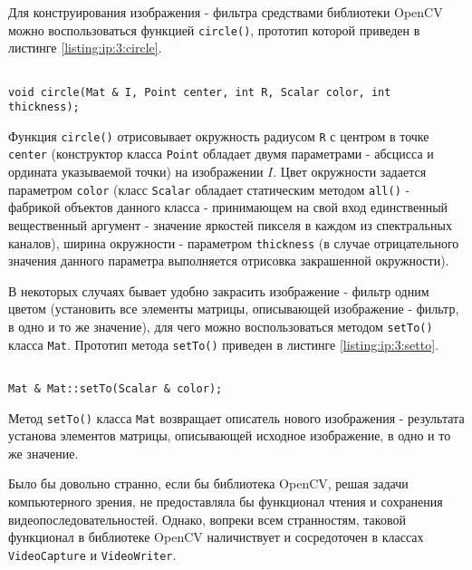 Для конструирования изображения - фильтра средствами библиотеки OpenCV можно воспользоваться функцией \verb|circle()|, прототип которой приведен в листинге \ref{listing:ip:3:circle}.

\begin{lstlisting}

void circle(Mat & I, Point center, int R, Scalar color, int thickness);

\end{lstlisting}
\mylistingend

Функция \verb|circle()| отрисовывает окружность радиусом \verb|R| с центром в точке \verb|center| (конструктор класса \verb|Point| обладает двумя параметрами - абсцисса и ордината указываемой точки) на изображении $I$. Цвет окружности задается параметром \verb|color| (класс \verb|Scalar| обладает статическим методом \verb|all()| - фабрикой объектов данного класса - принимающем на свой вход единственный вещественный аргумент - значение яркостей пикселя в каждом из спектральных каналов), ширина окружности - параметром \verb|thickness| (в случае отрицательного значения данного параметра выполняется отрисовка закрашенной окружности).

В некоторых случаях бывает удобно закрасить изображение - фильтр одним цветом (установить все элементы матрицы, описывающей изображение - фильтр, в одно и то же значение), для чего можно воспользоваться методом \verb|setTo()| класса \verb|Mat|. Прототип метода \verb|setTo()| приведен в листинге \ref{listing:ip:3:setto}.

\begin{lstlisting}

Mat & Mat::setTo(Scalar & color);

\end{lstlisting}
\mylistingend

Метод \verb|setTo()| класса \verb|Mat| возвращает описатель нового изображения - результата установа элементов матрицы, описывающей исходное изображение, в одно и то же значение.


Было бы довольно странно, если бы библиотека OpenCV, решая задачи компьютерного зрения, не предоставляла бы функционал чтения и сохранения видеопоследовательностей. Однако, вопреки всем странностям, таковой функционал в библиотеке OpenCV наличиствует и сосредоточен в классах \verb|VideoCapture| и \verb|VideoWriter|.

